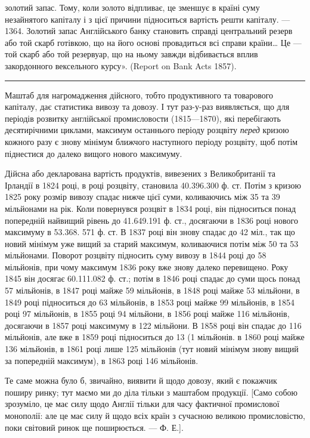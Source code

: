 \parcont{}  %
золотий запас. Тому, коли золото відпливає, це зменшує в країні суму незайнятого
капіталу і з цієї причини підноситься вартість решти капіталу. — 1364. Золотий
запас Англійського банку становить справді центральний резерв або той скарб
готівкою, що на його основі провадиться всі справи країни\dots{} Це — той скарб
або той резервуар, що на ньому завжди відбивається вплив закордонного вексельного
курсу». (Report on Bank Acts 1857).

\pfbreak

Маштаб для нагромадження дійсного, тобто продуктивного та товарового
капіталу, дає статистика вивозу та довозу. І тут раз-у-раз виявляється, що
для періодів розвитку англійської промисловости (1815—1870), які перебігають
десятирічними циклами, максимум останнього періоду розцвіту \emph{перед} кризою
кожного разу є знову мінімум ближчого наступного періоду розцвіту, щоб потім
піднестися до далеко вищого нового максимуму.

Дійсна або декларована вартість продуктів, вивезених з Великобританії та
Ірландії в 1824 році, в році розцвіту, становила 40.396.300 ф. ст. Потім з кризою
1825 року розмір вивозу спадає нижче цієї суми, коливаючись між 35 та 39 мільйонами
на рік. Коли повернувся розцвіт в 1834 році, він підноситься понад попередній
найвищий рівень до 41.649.191 ф. ст., досягаючи в 1836 році нового
максимуму в 53.368. 571 ф. ст. В 1837 році він знову спадає до 42 міл.,
так що новий мінімум уже вищий за старий максимум, коливаючися потім між
50 та 53 мільйонами. Поворот розцвіту підносить суму вивозу в 1844 році до
58 мільйонів, при чому максимум 1836 року вже знову далеко перевищено.
Року 1845 він досягає 60.111.082 ф. ст.; потім в 1846 році спадає до суми щось
понад 57 мільйонів, в 1847 році майже 59 мільйонів, в 1848 році майже 53 мільйони,
в 1849 році підноситься до 63 мільйонів, в 1853 році майже 99 мільйонів,
в 1854 році 97 мільйонів, в 1855 році 94 мільйони, в 1856 році майже
116 мільйонів, досягаючи в 1857 році максимуму в 122 мільйони. В 1858 році
він спадає до 116 мільйонів, але вже в 1859 році підноситься до 13 (1 мільйонів.
в 1860 році майже 136 мільйонів, в 1861 році лише 125 мільйонів (тут
новий мінімум знову вищий за попередній максимум), в 1863 році 146 мільйонів.

Те саме можна було б, звичайно, виявити й щодо довозу, який є покажчик
поширу ринку; тут маємо ми до діла тільки з маштабом продукції. [Само
собою зрозуміло, це має силу щодо Англії тільки для часу фактичної промислової
монополії: але це має силу й щодо всіх країн з сучасною великою промисловістю,
поки світовий ринок ще поширюється. — Ф. Е.].


